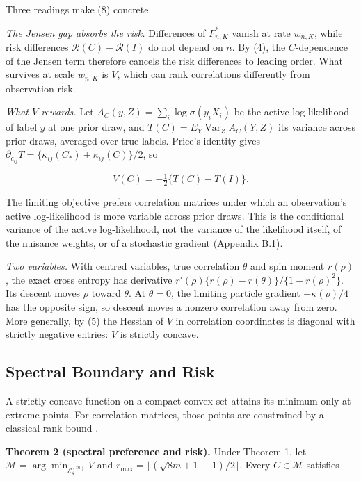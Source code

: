 \documentclass{article}
\begin{document}
Three readings make (8) concrete.

\emph{The Jensen gap absorbs the risk.} Differences of \(F^*_{n,K}\)
vanish at rate \(w_{n,K}\), while risk differences
\(\mathcal R(C)-\mathcal R(I)\) do not depend on \(n\). By (4), the
\(C\)-dependence of the Jensen term therefore cancels the risk
differences to leading order. What survives at scale \(w_{n,K}\) is
\(V\), which can rank correlations differently from observation risk.

\emph{What \(V\) rewards.} Let \(A_C(y,Z)=\sum_i\log\sigma(y_iX_i)\) be
the active log-likelihood of label \(y\) at one prior draw, and
\(T(C)=E_Y\operatorname{Var}_ZA_C(Y,Z)\) its variance across prior
draws, averaged over true labels. Price's identity gives
\(\partial_{c_{ij}}T=\{\kappa_{ij}(C_*)+\kappa_{ij}(C)\}/2\), so

\[
V(C)=-\tfrac12\{T(C)-T(I)\}.
\]

The limiting objective prefers correlation matrices under which an
observation's active log-likelihood is more variable across prior draws.
This is the conditional variance of the active log-likelihood, not the
variance of the likelihood itself, of the nuisance weights, or of a
stochastic gradient (Appendix B.1).

\emph{Two variables.} With centred variables, true correlation
\(\theta\) and spin moment \(r(\rho)\), the exact cross entropy has
derivative \(r'(\rho)\{r(\rho)-r(\theta)\}/\{1-r(\rho)^2\}\). Its
descent moves \(\rho\) toward \(\theta\). At \(\theta=0\), the limiting
particle gradient \(-\kappa(\rho)/4\) has the opposite sign, so descent
moves a nonzero correlation away from zero. More generally, by (5) the
Hessian of \(V\) in correlation coordinates is diagonal with strictly
negative entries: \(V\) is strictly concave.

\subsection{Spectral Boundary and
Risk}\label{spectral-boundary-and-risk}

A strictly concave function on a compact convex set attains its minimum
only at extreme points. For correlation matrices, those points are
constrained by a classical rank bound \citep{litam1994}.

\textbf{Theorem 2 (spectral preference and risk).} Under Theorem 1, let
\(\mathcal M=\arg\min_{\mathcal E_\delta^{(m)}}V\) and
\(r_{\max}=\lfloor(\sqrt{8m+1}-1)/2\rfloor\). Every \(C\in\mathcal M\)
satisfies
\end{document}
